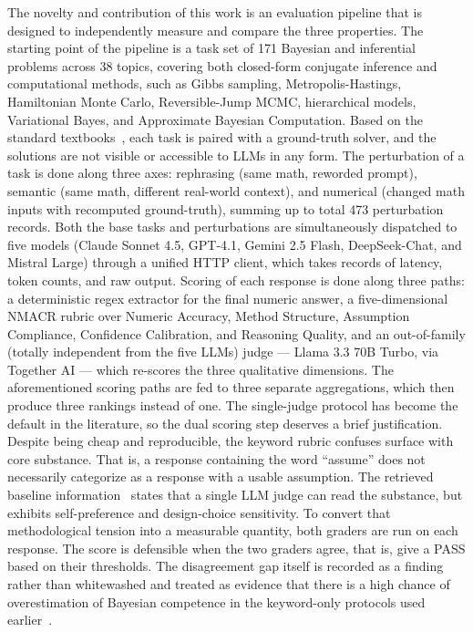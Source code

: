 The novelty and contribution of this work is an evaluation pipeline
that is designed to independently measure and compare the three
properties. The starting point of the pipeline is a task set of 171
Bayesian and inferential problems across 38 topics, covering both
closed-form conjugate inference and computational methods, such as
Gibbs sampling, Metropolis-Hastings, Hamiltonian Monte Carlo,
Reversible-Jump MCMC, hierarchical models, Variational Bayes, and
Approximate Bayesian Computation. Based on the standard
textbooks~\cite{bolstad2007bayesian,hoff2009bayesian,bishop2006prml},
each task is paired with a ground-truth solver, and the solutions
are not visible or accessible to LLMs in any form. The perturbation
of a task is done along three axes: rephrasing (same math, reworded
prompt), semantic (same math, different real-world context), and
numerical (changed math inputs with recomputed ground-truth),
summing up to total 473 perturbation records. Both the base tasks
and perturbations are simultaneously dispatched to five models
(Claude Sonnet 4.5, GPT-4.1, Gemini 2.5 Flash, DeepSeek-Chat, and
Mistral Large) through a unified HTTP client, which takes records of
latency, token counts, and raw output. Scoring of each response is
done along three paths: a deterministic regex extractor for the
final numeric answer, a five-dimensional NMACR rubric over Numeric
Accuracy, Method Structure, Assumption Compliance, Confidence
Calibration, and Reasoning Quality, and an out-of-family (totally
independent from the five LLMs) judge --- Llama 3.3 70B Turbo, via
Together AI --- which re-scores the three qualitative dimensions.
The aforementioned scoring paths are fed to three separate
aggregations, which then produce three rankings instead of one. The
single-judge protocol has become the default in the literature, so
the dual scoring step deserves a brief justification. Despite being
cheap and reproducible, the keyword rubric confuses surface with
core substance. That is, a response containing the word ``assume''
does not necessarily categorize as a response with a usable
assumption. The retrieved baseline
information~\cite{park2025judge,judgment2025noise} states that a
single LLM judge can read the substance, but exhibits self-preference
and design-choice sensitivity. To convert that methodological tension
into a measurable quantity, both graders are run on each response.
The score is defensible when the two graders agree, that is, give a
PASS based on their thresholds. The disagreement gap itself is
recorded as a finding rather than whitewashed and treated as
evidence that there is a high chance of overestimation of Bayesian
competence in the keyword-only protocols used
earlier~\cite{lu2025stateval,liu2025matheval}.

